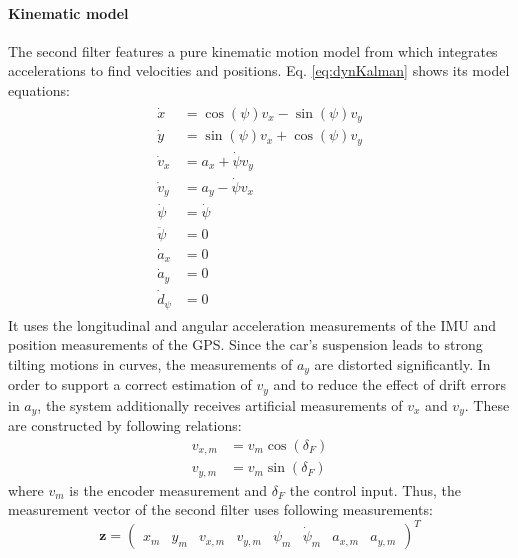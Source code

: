 \paragraph{Kinematic model} The second filter features a pure kinematic motion model from \cite{Caron2006} which integrates accelerations to find velocities and positions.
Eq. \eqref{eq:dynKalman} shows its model equations:
\begin{align}
\begin{split}\label{eq:dynKalman}
    \dot x &= \cos(\psi) v_x - \sin(\psi) v_y\\
    \dot y &= \sin(\psi) v_x + \cos(\psi) v_y\\
    \dot v_x &= a_x + \dot \psi v_y\\
    \dot v_y &= a_y - \dot \psi v_x\\
    \dot \psi &= \dot \psi\\
    \ddot \psi  &= 0\\
    \dot a_x &= 0\\
    \dot a_y &= 0\\
    \dot d_\psi &= 0
\end{split}
\end{align}
It uses the longitudinal and angular acceleration measurements of the IMU and position measurements of the GPS. Since the car's suspension leads to strong tilting motions in curves, the measurements of $a_y$ are distorted significantly. In order to support a correct estimation of $v_y$ and to reduce the effect of drift errors in $a_y$, the system additionally receives artificial measurements of $v_x$ and $v_y$. These are constructed by following relations:
\begin{align*}
v_{x,m} &= v_m\cos(\delta_F)\\
v_{y,m} &= v_m\sin(\delta_F)
\end{align*}
where $v_m$ is the encoder measurement and $\delta_F$ the control input.
Thus, the measurement vector of the second filter uses following measurements:
\begin{equation}
\bm{z}=\begin{pmatrix}x_m&y_m&v_{x,m}&v_{y,m}&\psi_m&\dot\psi_m&a_{x,m}&a_{y,m}\end{pmatrix}^T
\end{equation}
